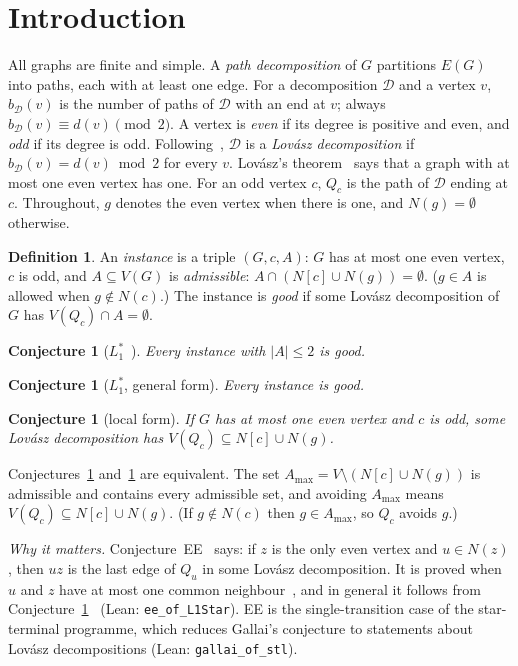 \documentclass[11pt]{amsart}
\newtheorem{conjecture}[theorem]{Conjecture}
\theoremstyle{definition}
\newtheorem{definition}[theorem]{Definition}
\newcommand{\cD}{\mathcal D}
\begin{document}
\section{Introduction}\label{sec:intro}

All graphs are finite and simple. A \emph{path decomposition} of $G$ partitions $E(G)$ into paths,
each with at least one edge. For a decomposition $\cD$ and a vertex $v$, $b_\cD(v)$ is the number of
paths of $\cD$ with an end at $v$; always $b_\cD(v)\equiv d(v)\pmod 2$. A vertex is \emph{even} if
its degree is positive and even, and \emph{odd} if its degree is odd. Following~\cite{RD}, $\cD$ is
a \emph{Lov\'asz decomposition} if $b_\cD(v)=d(v)\bmod2$ for every $v$. Lov\'asz's
theorem~\cite{L68} says that a graph with at most one even vertex has one. For an odd vertex $c$,
$Q_c$ is the path of $\cD$ ending at $c$. Throughout, $g$ denotes the even vertex when there is one,
and $N(g)=\emptyset$ otherwise.

\begin{definition}
An \emph{instance} is a triple $(G,c,A)$: $G$ has at most one even vertex, $c$ is odd, and
$A\subseteq V(G)$ is \emph{admissible}: $A\cap(N[c]\cup N(g))=\emptyset$. ($g\in A$ is allowed when
$g\notin N(c)$.) The instance is \emph{good} if some Lov\'asz decomposition of $G$ has
$V(Q_c)\cap A=\emptyset$.
\end{definition}

\begin{conjecture}[$L_1^*$~{\cite[Conjecture~7.3]{PE}}]\label{conj:L1}
Every instance with $|A|\le2$ is good.
\end{conjecture}

\begin{conjecture}[$L_1^*$, general form]\label{conj:gen}
Every instance is good.
\end{conjecture}

\begin{conjecture}[local form]\label{conj:loc}
If $G$ has at most one even vertex and $c$ is odd, some Lov\'asz decomposition has
$V(Q_c)\subseteq N[c]\cup N(g)$.
\end{conjecture}

Conjectures~\ref{conj:gen} and~\ref{conj:loc} are equivalent. The set
$A_{\max}=V\setminus(N[c]\cup N(g))$ is admissible and contains every admissible set, and avoiding
$A_{\max}$ means $V(Q_c)\subseteq N[c]\cup N(g)$. (If $g\notin N(c)$ then $g\in A_{\max}$, so $Q_c$
avoids $g$.)

\emph{Why it matters.} Conjecture~EE~\cite[Conjecture~1.5]{PE} says: if $z$ is the only even vertex
and $u\in N(z)$, then $uz$ is the last edge of $Q_u$ in some Lov\'asz decomposition. It is proved
when $u$ and $z$ have at most one common neighbour~\cite[Theorem~5.1]{PE}, and in general it follows
from Conjecture~\ref{conj:L1}~\cite[Corollary~7.4]{PE} (Lean: \texttt{ee\_of\_L1Star}). EE is the
single-transition case of the star-terminal programme, which reduces Gallai's conjecture to
statements about Lov\'asz decompositions (Lean: \texttt{gallai\_of\_stl}).
\end{document}
